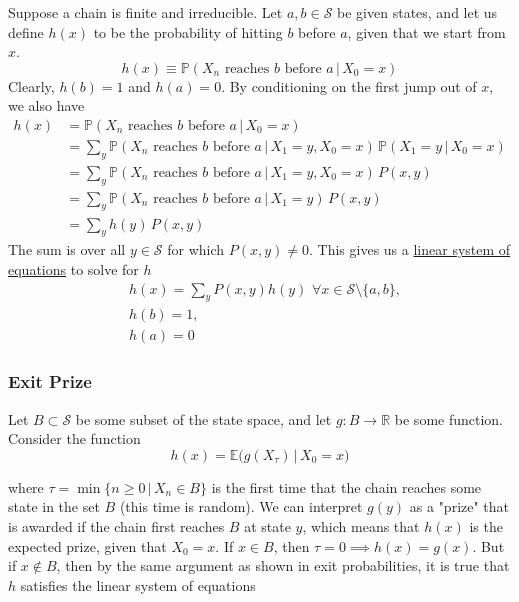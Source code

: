     Suppose a chain is finite and irreducible. Let $a, b \in \mathcal{S}$ be given states, and let us define $h(x)$ to be the probability of hitting $b$ before $a$, given that we start from $x$. 
    \begin{equation}
      h(x) \equiv \mathbb{P} (X_n \text{ reaches } b \text{ before } a \, | \, X_0 = x)
    \end{equation}
    Clearly, $h(b) = 1$ and $h(a) = 0$. By conditioning on the first jump out of $x$, we also have 
    \begin{align*}
      h(x) & = \mathbb{P}(X_n \text{ reaches } b \text{ before } a \, | \, X_0 = x) \\
      & = \sum_{y} \mathbb{P}(X_n \text{ reaches } b \text{ before } a \, | \, X_1 = y, X_0 = x) \, \mathbb{P}(X_1 = y \,|\,X_0 = x) \\
      & = \sum_y \mathbb{P}(X_n \text{ reaches } b \text{ before } a \, | \,X_1 = y, X_0 = x) \, P(x, y) \\
      & = \sum_y \mathbb{P}(X_n \text{ reaches } b \text{ before } a \, | \,X_1 = y) \, P(x, y) \\
      & = \sum_y h(y) \, P(x, y) 
    \end{align*}
    The sum is over all $y \in \mathcal{S}$ for which $P(x, y) \neq 0$. This gives us a \hyperref[lin-def:linear-system-of-equations]{linear system of equations} to solve for $h$
    \begin{align*}
      & h(x) = \sum_y P(x, y) h(y) \,\, \forall x \in \mathcal{S} \setminus \{a, b\}, \\
      & h(b) = 1, \\
      & h(a) = 0
    \end{align*}

  \subsubsection{Exit Prize}

    Let $B \subset \mathcal{S}$ be some subset of the state space, and let $g: B \to \mathbb{R}$ be some function. Consider the function 
    \begin{equation}
      h(x) = \mathbb{E}\big( g(X_\tau) \, |\, X_0 = x \big)
    \end{equation}

    where $\tau = \min\{ n\geq 0 \,|\, X_n \in B\}$ is the first time that the chain reaches some state in the set $B$ (this time is random). We can interpret $g(y)$ as a "prize" that is awarded if the chain first reaches $B$ at state $y$, which means that $h(x)$ is the expected prize, given that $X_0 = x$. If $x \in B$, then $\tau = 0 \implies h(x) = g(x)$. But if $x \not\in B$, then by the same argument as shown in exit probabilities, it is true that $h$ satisfies the linear system of equations

